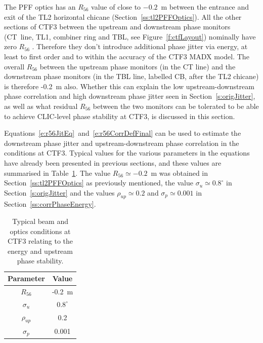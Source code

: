 The PFF optics has an \(R_{56}\) value of close to \(-0.2\)~m between the entrance and exit of the TL2 horizontal chicane (Section~\ref{ss:tl2PFFOptics}).
All the other sections of CTF3 between the upstream and downstream phase monitors (CT~line, TL1, combiner ring and TBL, see Figure~\ref{f:ctfLayout}) nominally have zero \(R_{56}\) \cite{CTF3}. Therefore they don't introduce additional phase jitter via energy, at least to first order and to within the accuracy of the CTF3 MADX model. The overall \(R_{56}\) between the upstream phase monitors (in the CT line) and the downstream phase monitors (in the TBL line, labelled CB, after the TL2 chicane) is therefore -0.2~m also. Whether this can explain the low upstream-downstream phase correlation and high downstream phase jitter seen in Section~\ref{s:origJitter}, as well as what residual \(R_{56}\) between the two monitors can be tolerated to be able to achieve CLIC-level phase stability at CTF3, is discussed in this section.

Equations~\ref{e:r56JitEq}~and~\ref{e:r56CorrDefFinal} can be used to estimate the downstream phase jitter and upstream-downstream phase correlation in the conditions at CTF3. Typical values for the various parameters in the equations have already been presented in previous sections, and these values are summarised in Table~\ref{t:r56Params}. The value \(R_{56}\simeq -0.2\)~m was obtained in Section~\ref{ss:tl2PFFOptics} as previously mentioned, the value \(\sigma_u\simeq0.8^\circ\) in Section~\ref{s:origJitter} and the values \(\rho_{up}\simeq 0.2\) and \(\sigma_p\simeq 0.001\) in Section~\ref{ss:corrPhaseEnergy}.

\begin{table}
  \begin{center}
    \begin{tabular}{| c c |}
	   \hline
       Parameter & Value \\ \hline
       \(R_{56}\) & -0.2~m \\
       \(\sigma_u\) & \(0.8^\circ\) \\
       \(\rho_{up}\) & 0.2 \\
       \(\sigma_{p}\) & 0.001 \\ \hline
    \end{tabular}
    \caption{Typical beam and optics conditions at CTF3 relating to the energy and upstream phase stability.}
  	\label{t:r56Params}
  \end{center}
\end{table}




